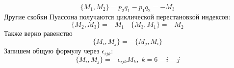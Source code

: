 \documentclass[12pt]{article}
\begin{document}
\begin{enumerate}
    \begin{equation}
        \{M_1, M_2\}=p_2q_1-p_1q_2=-M_3
    \end{equation}
    Другие скобки Пуассона получаются циклической перестановкой индексов:
    \begin{equation}
        \{M_2, M_3\} = -M_1\quad \{M_3, M_1\} = -M_2
    \end{equation}
    Также верно равенство
    \begin{equation}
        \{M_i, M_j\} = -\{M_j, M_i\}
    \end{equation}
    Запишем общую формулу через $\epsilon_{ijk}$:
    \begin{equation}
        \boxed{\{M_i, M_j\}=-\epsilon_{ijk}M_k,\;k=6-i-j}
    \end{equation}
\end{enumerate}
\end{document}
